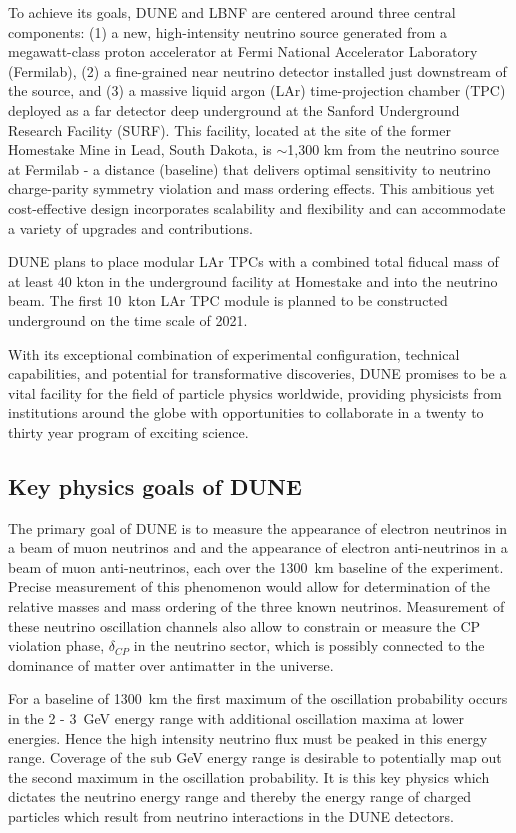 To achieve its goals, DUNE and LBNF are centered around three central components: (1) a new, high-intensity neutrino source generated from a megawatt-class proton accelerator at Fermi National Accelerator Laboratory (Fermilab), (2) a fine-grained near neutrino detector installed just downstream of the source, and (3) a massive liquid argon (LAr) time-projection chamber (TPC) deployed as a far detector deep underground at the Sanford Underground Research Facility (SURF). This facility, located at the site of the former Homestake Mine in Lead, South Dakota, is $\sim$1,300 km from the neutrino source at Fermilab - a distance (baseline) that delivers optimal sensitivity to neutrino charge-parity symmetry violation and mass ordering effects. This ambitious yet cost-effective design incorporates scalability and flexibility and can accommodate a variety of upgrades and contributions.

DUNE plans to place modular LAr TPCs with a combined total fiducal mass of at least  40 kton in the underground facility at Homestake and into the neutrino beam.
The first 10~kton LAr TPC module is planned to be constructed underground on the time scale of 2021.

With its exceptional combination of experimental configuration, technical capabilities, and potential for transformative discoveries, DUNE promises to be a vital facility for the field of particle physics worldwide, providing physicists from institutions around the globe with opportunities to collaborate in a twenty to thirty year program of exciting science.



\subsection{Key physics goals of DUNE}


The primary goal of DUNE  is to measure the appearance of electron neutrinos in a beam of muon neutrinos and 
and the appearance of electron anti-neutrinos in a beam of muon anti-neutrinos, each
 over the 1300~km baseline of the experiment. Precise measurement of this
phenomenon would allow for determination of the relative masses and mass ordering of the three
known neutrinos. Measurement of these neutrino oscillation channels also allow to constrain or measure the
CP violation phase, $\delta_{CP}$ in the neutrino sector, which is possibly connected to the dominance of matter
over antimatter in the universe.

For a baseline of 1300~km the first maximum of the oscillation probability occurs in the 2 - 3~GeV energy range with additional  
oscillation maxima at lower energies. Hence the high intensity neutrino flux must be peaked in this energy range. Coverage of the 
sub GeV energy range is desirable to potentially map out the second maximum in the oscillation probability.
It is this key physics which dictates the neutrino energy range and thereby the energy range of charged particles which result from neutrino 
interactions in the DUNE detectors. 


